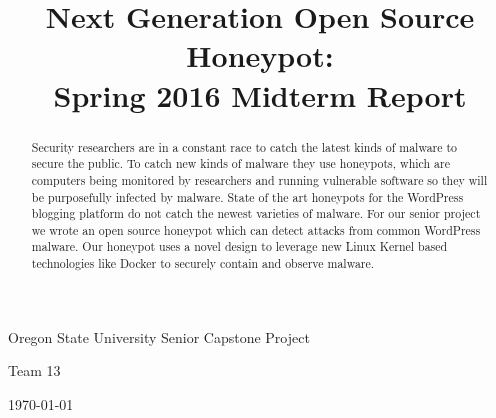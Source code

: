\documentclass[10pt,conference,draftclsnofoot,onecolumn]{IEEEtran}
\begin{document}
\begin{titlepage}
\author{
\and
{}
\and
{}
}

\title { Next Generation Open Source Honeypot: \\Spring 2016 Midterm Report}
\maketitle
    \centering
    {\Large Oregon State University Senior Capstone Project\\ \par}
    {\Large Team 13\\\par}
    \vspace{1.5cm}



    \begin{abstract}
    Security researchers are in a constant race to catch the latest kinds of malware to secure the public. To catch new kinds of malware they use honeypots, which are computers being monitored by researchers and running vulnerable software so they will be purposefully infected by malware. State of the art honeypots for the WordPress blogging platform do not catch the newest varieties of malware. For our senior project we wrote an open source honeypot which can detect attacks from common WordPress malware. Our honeypot uses a novel design to leverage new Linux Kernel based technologies like Docker to securely contain and observe malware.

    \end{abstract}
    \vfill
    {\large \today\par}


\end{titlepage}
\end{document}
